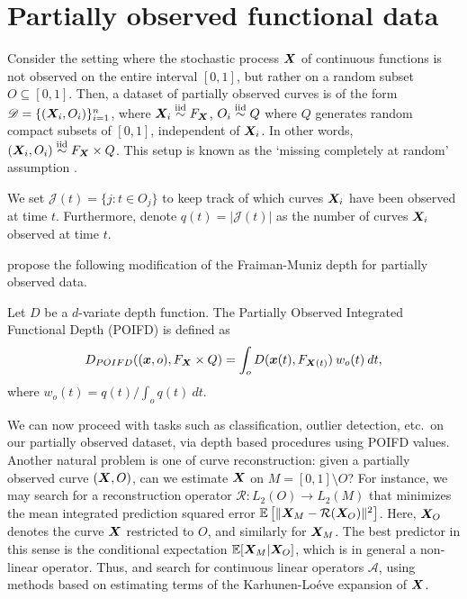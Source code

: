 \section{Partially observed functional data}

Consider the setting where the stochastic process $\bm{X}$ of continuous
functions is not observed on the entire interval $[0, 1]$, but rather on a
random subset $O \subseteq [0, 1]$.
Then, a dataset of partially observed curves is of the form $\mathscr{D} =
\{(\bm{X}_i, O_i)\}_{i = 1}^n$, where $\bm{X}_i \overset{\text{iid}}{\sim} F_{\bm{X}}$, $O_i \overset{\text{iid}}{\sim} Q$ where
$Q$ generates random compact subsets of $[0, 1]$, independent of $\bm{X}_i$.
In other words, $(\bm{X}_i, O_i) \overset{\text{iid}}{\sim} F_{\bm{X}} \times Q$.
This setup is known as the `missing completely at random' assumption
\parencite{kraus-2015}.

We set $\mathscr{J}(t) = \{j\colon t \in O_j\}$ to keep track of which curves
$\bm{X}_i$ have been observed at time $t$.
Furthermore, denote $q(t) = |\mathscr{J}(t)|$ as the number of curves $\bm{X}_i$
observed at time $t$.

\textcite{elias-jimenez-paganoni-sangalli-2023} propose the following
modification of the Fraiman-Muniz depth for partially observed data.

\begin{definition}
    Let $D$ be a $d$-variate depth function.
    The Partially Observed Integrated Functional Depth (POIFD) is defined as
    \begin{equation}
        D_{POIFD}((\bm{x}, o), F_{\bm{X}} \times Q) = \int_o D(\bm{x}(t), F_{\bm{X}(t)})\:w_o(t) \:dt,
    \end{equation}
    where $w_o(t) = q(t) / \int_o q(t)\:dt$.
\end{definition}

We can now proceed with tasks such as classification, outlier detection, etc.\
on our partially observed dataset, via depth based procedures using POIFD
values.
Another natural problem is one of curve reconstruction: given a partially
observed curve $(\bm{X}, O)$, can we estimate $\bm{X}$ on $M = [0, 1]\setminus O$?
For instance, we may search for a reconstruction operator $\mathcal{R}\colon
L_2(O) \to L_2(M)$ that minimizes the mean integrated prediction squared error
$\operatorname{\mathbb{E}}\left[\Vert \bm{X}_M - \mathcal{R}(\bm{X}_O) \Vert^2\right]$.
Here, $\bm{X}_O$ denotes the curve $\bm{X}$ restricted to $O$, and similarly for
$\bm{X}_M$.
The best predictor in this sense is the conditional expectation $\operatorname{\mathbb{E}}[\bm{X}_M |
\bm{X}_O]$, which is in general a non-linear operator.
Thus, \textcite{kraus-2015} and \textcite{kneip-liebl-2020} search for
continuous linear operators $\mathcal{A}$, using methods based on estimating
terms of the Karhunen-Lo\'eve expansion of $\bm{X}$.

